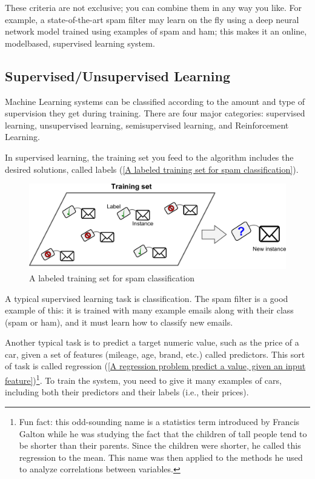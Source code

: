 These criteria are not exclusive; you can combine them in any way you like. For
example, a state-of-the-art spam filter may learn on the fly using a deep neural network model trained using examples of spam and ham; this makes it an online, modelbased, supervised learning system.

\subsection{Supervised/Unsupervised Learning}
Machine Learning systems can be classified according to the amount and type of
supervision they get during training. There are four major categories: supervised
learning, unsupervised learning, semisupervised learning, and Reinforcement
Learning.

In supervised learning, the training set you feed to the algorithm includes the desired
solutions, called labels (\autoref{A labeled training set for spam classification}).
\begin{figure}
\centering
\includegraphics{img/A labeled training set for spam classification.png}
\caption{A labeled training set for spam classification}
\label{A labeled training set for spam classification}
\end{figure}

A typical supervised learning task is classification. The spam filter is a good example
of this: it is trained with many example emails along with their class (spam or ham),
and it must learn how to classify new emails.

Another typical task is to predict a target numeric value, such as the price of a car,
given a set of features (mileage, age, brand, etc.) called predictors. This sort of task is
called regression (\autoref{A regression problem predict a value, given an input feature})\footnote{Fun fact: this odd-sounding name is a statistics term introduced by Francis Galton while he was studying the
fact that the children of tall people tend to be shorter than their parents. Since the children were shorter, he
called this regression to the mean. This name was then applied to the methods he used to analyze correlations
between variables.}. To train the system, you need to give it many examples
of cars, including both their predictors and their labels (i.e., their prices).


